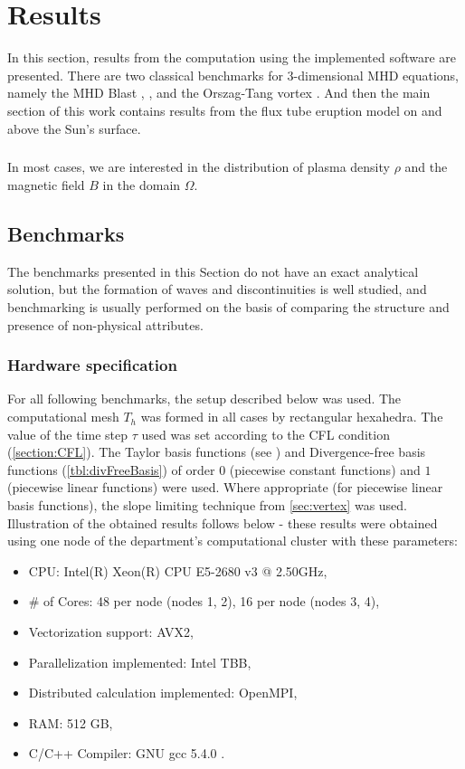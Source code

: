 \chapter{Results}
In this section, results from the computation using the implemented software are presented. There are two classical benchmarks for 3-dimensional MHD equations, namely the MHD Blast \cite{blast1}, \cite{blast2}, and the Orszag-Tang vortex \cite{vortex}. And then the main section of this work contains results from the flux tube eruption model on and above the Sun's surface.
\paragraph{}
In most cases, we are interested in the distribution of plasma density $\rho$ and the magnetic field $B$ in the domain $\Omega$.

\section{Benchmarks}
\label{sec:benchmarks}
The benchmarks presented in this Section do not have an exact analytical solution, but the formation of waves and discontinuities is well studied, and benchmarking is usually performed on the basis of comparing the structure and presence of non-physical attributes.
\subsection{Hardware specification}
For all following benchmarks, the setup described below was used. The computational mesh $T_h$ was formed in all cases by rectangular hexahedra.
The value of the time step $\tau$ used was set according to the CFL condition (\cref{section:CFL}).
The Taylor basis functions (see \cite{KuzminVertex}) and Divergence-free basis functions (\cref{tbl:divFreeBasis}) of order $0$ (piecewise constant functions) and $1$ (piecewise linear functions) were used.
Where appropriate (for piecewise linear basis functions), the slope limiting technique from \cref{sec:vertex} was used.
Illustration of the obtained results follows below - these results were obtained using one node of the department's computational cluster with these parameters:
\begin{itemize}
    \item CPU: Intel(R) Xeon(R) CPU E5-2680 v3 @ 2.50GHz,
    \item \# of Cores: 48 per node (nodes 1, 2), 16 per node (nodes 3, 4),
    \item Vectorization support: AVX2,
    \item Parallelization implemented: Intel TBB,
    \item Distributed calculation implemented: OpenMPI,
    \item RAM: 512 GB,
    \item C/C++ Compiler: GNU gcc 5.4.0 .
\end{itemize}

